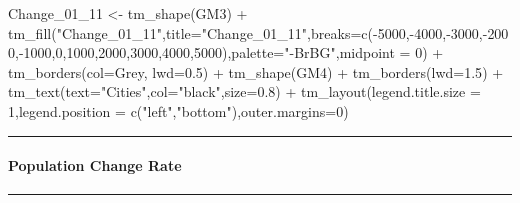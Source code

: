 \documentclass[
]{article}
\newenvironment{Shaded}{\begin{snugshade}}{\end{snugshade}}
\newcommand{\AttributeTok}[1]{\textcolor[rgb]{0.77,0.63,0.00}{#1}}
\newcommand{\DecValTok}[1]{\textcolor[rgb]{0.00,0.00,0.81}{#1}}
\newcommand{\FloatTok}[1]{\textcolor[rgb]{0.00,0.00,0.81}{#1}}
\newcommand{\FunctionTok}[1]{\textcolor[rgb]{0.00,0.00,0.00}{#1}}
\newcommand{\NormalTok}[1]{#1}
\newcommand{\OtherTok}[1]{\textcolor[rgb]{0.56,0.35,0.01}{#1}}
\newcommand{\SpecialCharTok}[1]{\textcolor[rgb]{0.00,0.00,0.00}{#1}}
\newcommand{\StringTok}[1]{\textcolor[rgb]{0.31,0.60,0.02}{#1}}
\begin{document}
\begin{Shaded}
\begin{Highlighting}[]
\NormalTok{Change\_01\_11 }\OtherTok{\textless{}{-}} \FunctionTok{tm\_shape}\NormalTok{(GM3) }\SpecialCharTok{+}
  \FunctionTok{tm\_fill}\NormalTok{(}\StringTok{"Change\_01\_11"}\NormalTok{,}\AttributeTok{title=}\StringTok{"Change\_01\_11"}\NormalTok{,}\AttributeTok{breaks=}\FunctionTok{c}\NormalTok{(}\SpecialCharTok{{-}}\DecValTok{5000}\NormalTok{,}\SpecialCharTok{{-}}\DecValTok{4000}\NormalTok{,}\SpecialCharTok{{-}}\DecValTok{3000}\NormalTok{,}\SpecialCharTok{{-}}\DecValTok{2000}\NormalTok{,}\SpecialCharTok{{-}}\DecValTok{1000}\NormalTok{,}\DecValTok{0}\NormalTok{,}\DecValTok{1000}\NormalTok{,}\DecValTok{2000}\NormalTok{,}\DecValTok{3000}\NormalTok{,}\DecValTok{4000}\NormalTok{,}\DecValTok{5000}\NormalTok{),}\AttributeTok{palette=}\StringTok{"{-}BrBG"}\NormalTok{,}\AttributeTok{midpoint =} \DecValTok{0}\NormalTok{) }\SpecialCharTok{+}
 \FunctionTok{tm\_borders}\NormalTok{(}\AttributeTok{col=}\StringTok{\textquotesingle{}Grey\textquotesingle{}}\NormalTok{, }\AttributeTok{lwd=}\FloatTok{0.5}\NormalTok{) }\SpecialCharTok{+}
\FunctionTok{tm\_shape}\NormalTok{(GM4) }\SpecialCharTok{+}
  \FunctionTok{tm\_borders}\NormalTok{(}\AttributeTok{lwd=}\FloatTok{1.5}\NormalTok{) }\SpecialCharTok{+}
  \FunctionTok{tm\_text}\NormalTok{(}\AttributeTok{text=}\StringTok{"Cities"}\NormalTok{,}\AttributeTok{col=}\StringTok{"black"}\NormalTok{,}\AttributeTok{size=}\FloatTok{0.8}\NormalTok{) }\SpecialCharTok{+}
\FunctionTok{tm\_layout}\NormalTok{(}\AttributeTok{legend.title.size =} \DecValTok{1}\NormalTok{,}\AttributeTok{legend.position =} \FunctionTok{c}\NormalTok{(}\StringTok{"left"}\NormalTok{,}\StringTok{"bottom"}\NormalTok{),}\AttributeTok{outer.margins=}\DecValTok{0}\NormalTok{)}
\end{Highlighting}
\end{Shaded}

\begin{center}\rule{0.5\linewidth}{0.5pt}\end{center}

\hypertarget{population-change-rate}{%
\paragraph{Population Change Rate}\label{population-change-rate}}

\begin{center}\rule{0.5\linewidth}{0.5pt}\end{center}
\end{document}
